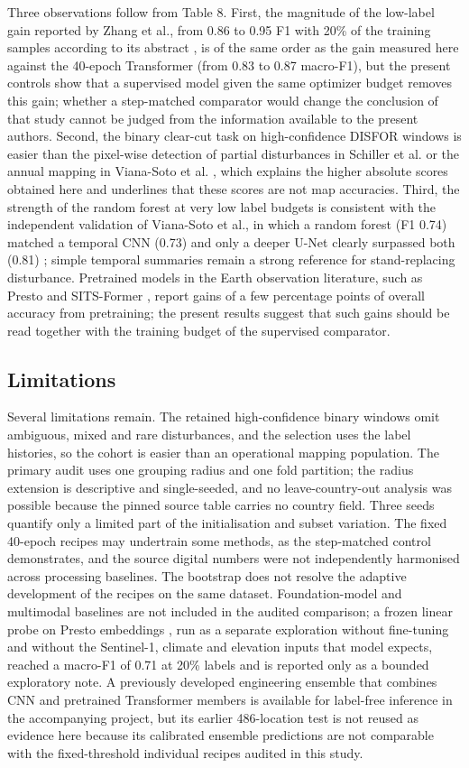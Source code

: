 \documentclass[11pt,a4paper]{article}
\begin{document}
Three observations follow from Table 8. First, the magnitude of the low-label gain reported by Zhang et al., from 0.86 to 0.95 F1 with 20\% of the training samples according to its abstract \cite{ref2}, is of the same order as the gain measured here against the 40-epoch Transformer (from 0.83 to 0.87 macro-F1), but the present controls show that a supervised model given the same optimizer budget removes this gain; whether a step-matched comparator would change the conclusion of that study cannot be judged from the information available to the present authors. Second, the binary clear-cut task on high-confidence DISFOR windows is easier than the pixel-wise detection of partial disturbances in Schiller et al. \cite{ref27} or the annual mapping in Viana-Soto et al. \cite{ref28}, which explains the higher absolute scores obtained here and underlines that these scores are not map accuracies. Third, the strength of the random forest at very low label budgets is consistent with the independent validation of Viana-Soto et al., in which a random forest (F1 0.74) matched a temporal CNN (0.73) and only a deeper U-Net clearly surpassed both (0.81) \cite{ref28}; simple temporal summaries remain a strong reference for stand-replacing disturbance. Pretrained models in the Earth observation literature, such as Presto \cite{ref7} and SITS-Former \cite{ref10}, report gains of a few percentage points of overall accuracy from pretraining; the present results suggest that such gains should be read together with the training budget of the supervised comparator.

\subsection{Limitations}
Several limitations remain. The retained high-confidence binary windows omit ambiguous, mixed and rare disturbances, and the selection uses the label histories, so the cohort is easier than an operational mapping population. The primary audit uses one grouping radius and one fold partition; the radius extension is descriptive and single-seeded, and no leave-country-out analysis was possible because the pinned source table carries no country field. Three seeds quantify only a limited part of the initialisation and subset variation. The fixed 40-epoch recipes may undertrain some methods, as the step-matched control demonstrates, and the source digital numbers were not independently harmonised across processing baselines. The bootstrap does not resolve the adaptive development of the recipes on the same dataset. Foundation-model and multimodal baselines are not included in the audited comparison; a frozen linear probe on Presto embeddings \cite{ref7}, run as a separate exploration without fine-tuning and without the Sentinel-1, climate and elevation inputs that model expects, reached a macro-F1 of 0.71 at 20\% labels and is reported only as a bounded exploratory note. A previously developed engineering ensemble that combines CNN and pretrained Transformer members is available for label-free inference in the accompanying project, but its earlier 486-location test is not reused as evidence here because its calibrated ensemble predictions are not comparable with the fixed-threshold individual recipes audited in this study.
\end{document}
